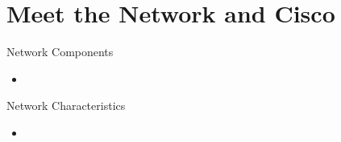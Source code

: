 \section[meet]{Meet the Network and Cisco}

\begin{frame}{Network Components}
	\begin{itemize}[<+->]
		\item 
		\begin{itemize}
		\end{itemize}
	\end{itemize}
\end{frame}
\begin{frame}{Network Characteristics}
	\begin{itemize}[<+->]
		\item 
	\end{itemize}
\end{frame}

